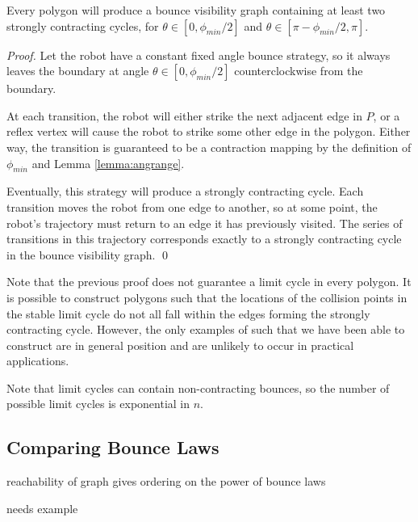 \documentclass[]{styles/svproc}  %
\begin{document}
\begin{corollary}
Every polygon will produce a bounce visibility graph containing at least two
strongly contracting cycles, for $\theta \in [0, \phi_{min}/2]$ and $\theta \in
[\pi - \phi_{min}/2, \pi]$.
\end{corollary}

\begin{proof}

Let the robot have a constant fixed angle bounce strategy, so it always leaves
the boundary at angle $\theta \in [0,\phi_{min}/2]$ counterclockwise from the
boundary.

At each transition, the robot will either strike the next adjacent edge in
$P$, or a reflex vertex will cause the robot to strike some other edge in the
polygon. Either way, the transition is guaranteed to be a contraction mapping by
the definition of $\phi_{min}$ and Lemma \ref{lemma:angrange}.

Eventually, this strategy will produce a strongly contracting cycle. Each
transition moves the robot from one edge to another, so at some point, the
robot's trajectory must return to an edge it has previously visited. The series
of transitions in this trajectory corresponds exactly to a strongly contracting
cycle in the bounce visibility graph.
\qed

\end{proof}

Note that the previous proof does not guarantee a limit cycle in every polygon.
It is possible to construct polygons such that the locations of the collision
points in the stable limit cycle do not all fall within the edges forming the
strongly contracting cycle. However, the only examples of such that we have been
able to construct are in general position and are unlikely to occur in practical
applications.

Note that limit cycles can contain non-contracting bounces, so the number of
possible limit cycles is exponential in $n$.



\subsection{Comparing Bounce Laws}

\begin{remark}
reachability of graph gives ordering on the power of bounce laws
\end{remark}

{\color{red} needs example}
\end{document}
